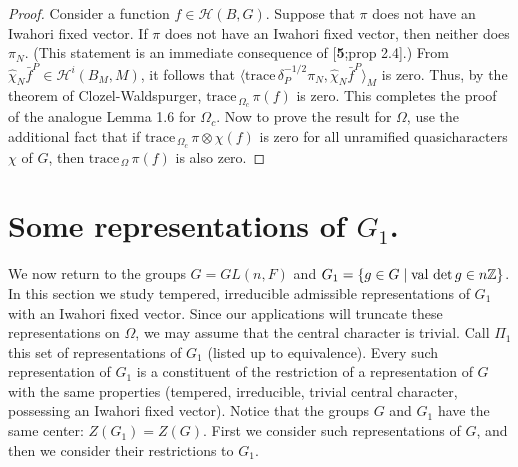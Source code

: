 \documentclass{amsart}
\begin{document}
\begin{proof}
Consider a function
  $ f \in {\mathcal H} (B,G) $.
Suppose that 
  $ \pi $
does not have an Iwahori fixed vector.
If 
  $ \pi $
does not have an Iwahori fixed vector, then neither does
  $ \pi_N $.
(This statement is an immediate consequence of [{\bf 5};prop 2.4].)
From
  $ \hat {\chi}_N \bar f^P \in {\mathcal H}^i
    (B_M,M) $,
it follows that
  $ \langle
      \text{trace} \, \delta_P^{-1/2}
      \pi_N,
      \hat \chi_N
      \bar f^P
    \rangle_M$ %
is zero.
Thus, by the theorem of Clozel-Waldspurger,
$
  \text{trace}_{\,\Omega_c}\, \pi (f)
$ is zero.
%
This completes the proof of the analogue Lemma 1.6 for $\Omega_c$.
Now to prove the result for $\Omega$, use the additional fact
that if $\text{trace}_{\,\Omega_c}\,\pi\otimes\chi(f)$ is zero for all
unramified quasicharacters $\chi$ of $G$, then 
$\text{trace}_{\,\Omega}\,\pi(f)$ is also zero.
\end{proof}


\section{{Some representations of $G_1$.}}

\medskip\noindent
We now return to the groups $ G=GL(n,F) $
and 
  $G_1=\{g\in G\mid \text{val\,}\det g\in n{\Bbb Z}\}$.
In this section we study tempered, irreducible admissible
  representations of $G_1$ with an Iwahori fixed vector.  Since our applications 
  will truncate these representations on $\Omega$, we
  may assume that the central character is trivial.
Call 
  $ \Pi_1$
this set of representations of $G_1$
  (listed up to equivalence).
Every such representation of $G_1$ is a constituent
  of the restriction of a representation of $G$ with 
  the same properties (tempered, irreducible, trivial central character,
   possessing an Iwahori fixed vector).
Notice that the groups $G$ and $G_1$ have the same center:
  $Z(G_1) = Z(G)$.
First we consider such representations of 
$G$, and then we consider their restrictions to $G_1$.
\end{document}
